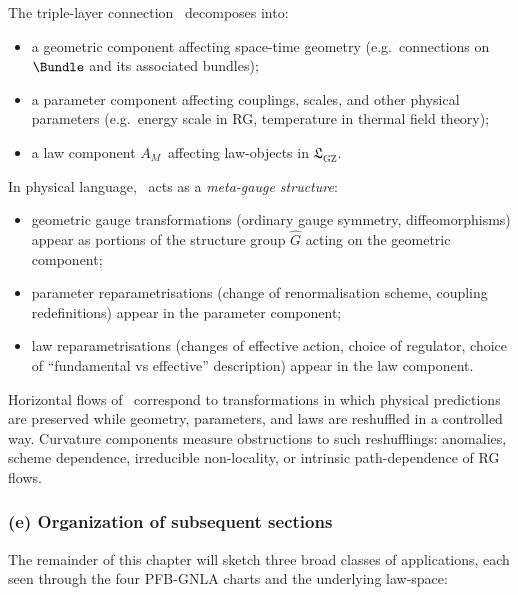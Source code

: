 \documentclass[11pt]{book}
\theoremstyle{plain}
\theoremstyle{definition}
\newcommand{\GZLS}{\ensuremath{\mathfrak{L}_{\mathrm{GZ}}}}       \newcommand{\GZLT}{\ensuremath{M_{!w}}}                           \newcommand{\GZLOC}{\ensuremath{A_M}}                             \newcommand{\GZLCurv}{\ensuremath{\mathcal{F}_{\mathrm{law}}}}
\begin{document}
The triple-layer connection \GZTLC\ decomposes into:

\begin{itemize}
  \item a geometric component affecting space-time geometry (e.g.\
        connections on $\Bundle$ and its associated bundles);
  \item a parameter component affecting couplings, scales, and other
        physical parameters (e.g.\ energy scale in RG, temperature in
        thermal field theory);
  \item a law component \GZLOC\ affecting law-objects in \GZLS.
\end{itemize}

In physical language, \GZTLC\ acts as a \emph{meta-gauge structure}:

\begin{itemize}
  \item geometric gauge transformations (ordinary gauge symmetry,
        diffeomorphisms) appear as portions of the structure group
        $\widehat{G}$ acting on the geometric component;
  \item parameter reparametrisations (change of renormalisation scheme,
        coupling redefinitions) appear in the parameter component;
  \item law reparametrisations (changes of effective action, choice of
        regulator, choice of “fundamental vs effective” description)
        appear in the law component.
\end{itemize}

Horizontal flows of \GZTLC\ correspond to transformations in which
physical predictions are preserved while geometry, parameters, and laws
are reshuffled in a controlled way. Curvature components measure
obstructions to such reshufflings: anomalies, scheme dependence,
irreducible non-locality, or intrinsic path-dependence of RG flows.



\subsubsection*{(e) Organization of subsequent sections}

The remainder of this chapter will sketch three broad classes of
applications, each seen through the four PFB-GNLA charts and the
underlying law-space:
\end{document}
